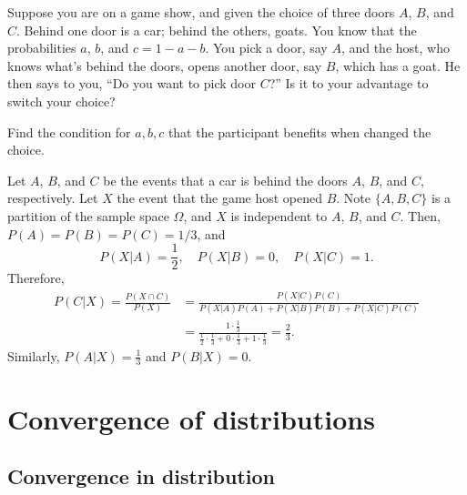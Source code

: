 \documentclass{../../large}
\begin{document}
\begin{prb}
Suppose you are on a game show, and given the choice of three doors $A$, $B$, and $C$.
Behind one door is a car; behind the others, goats.
You know that the probabilities $a$, $b$, and $c=1-a-b$.
You pick a door, say $A$, and the host, who knows what's behind the doors, opens another door, say $B$, which has a goat.
He then says to you, ``Do you want to pick door $C$?''
Is it to your advantage to switch your choice?
\begin{parts}
\item Find the condition for $a,b,c$ that the participant benefits when changed the choice.
\end{parts}
\end{prb}
\begin{pf}
Let $A$, $B$, and $C$ be the events that a car is behind the doors $A$, $B$, and $C$, respectively.
Let $X$ the event that the game host opened $B$.
Note $\{A,B,C\}$ is a partition of the sample space $\Omega$, and $X$ is independent to $A$, $B$, and $C$.
Then, $P(A)=P(B)=P(C)=1/3$, and
\[P(X|A)=\frac12,\quad P(X|B)=0,\quad P(X|C)=1.\]
Therefore,
\begin{align*}
P(C|X)=\frac{P(X\cap C)}{P(X)}
&=\frac{P(X|C)P(C)}{P(X|A)P(A)+P(X|B)P(B)+P(X|C)P(C)}\\
&=\frac{1\cdot \frac13}{\frac12\cdot\frac13+0\cdot\frac13+1\cdot\frac13}=\frac23.
\end{align*}
Similarly, $P(A|X)=\frac13$ and $P(B|X)=0$.
\end{pf}










\chapter{Convergence of distributions}











\section{Convergence in distribution}




\end{document}
